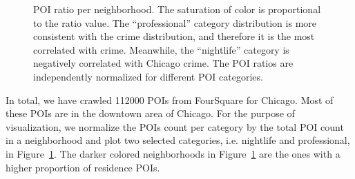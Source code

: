 \begin{figure}[tb]
\centering
\caption{POI ratio per neighborhood. The saturation of color is proportional to the ratio value. The ``professional'' category distribution is more consistent with the crime distribution, and therefore it is the most correlated with crime. Meanwhile, the ``nightlife'' category is negatively correlated with Chicago crime. The POI ratios are independently normalized for different POI categories.}
\label{fig:poi-coef}
\end{figure}

In total, we have crawled \num{112000}  POIs from FourSquare for Chicago. Most of these POIs are in the downtown area of Chicago. For the purpose of visualization, we normalize the POIs count per category by the total POI count in a neighborhood and plot two selected categories, i.e. nightlife and professional, in Figure~\ref{fig:poi-coef}.  The darker colored neighborhoods in Figure~\ref{fig:poi-coef} are the ones with a higher proportion of residence POIs.



